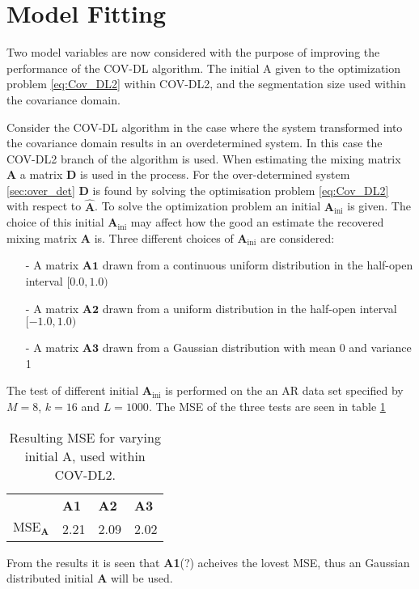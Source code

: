 \section{Model Fitting}
Two model variables are now considered with the purpose of improving the performance of the COV-DL algorithm. The initial A given to the optimization problem \eqref{eq:Cov_DL2} within COV-DL2, and the segmentation size used within the covariance domain.   
   
Consider the COV-DL algorithm in the case where the system transformed into the covariance domain results in an overdetermined system. In this case the COV-DL2 branch of the algorithm is used. 
When estimating the mixing matrix $\mathbf{A}$ a matrix $\mathbf{D}$ is used in the process. For the over-determined system \ref{sec:over_det} $\mathbf{D}$ is found by solving the optimisation problem \eqref{eq:Cov_DL2} with respect to $\hat{\textbf{A}}$. To solve the optimization problem an initial $\mathbf{A}_{\text{ini}}$ is given. The choice of this initial $\mathbf{A}_{\text{ini}}$ may affect how the good an estimate the recovered mixing matrix $\mathbf{A}$ is.
Three different choices of $\mathbf{A}_{\text{ini}}$ are considered:
\begin{itemize}
\item[-] A matrix $\mathbf{A1}$ drawn from a continuous uniform distribution in the half-open interval $[0.0, 1.0)$
\item[-] A matrix $\mathbf{A2}$ drawn from a uniform distribution in the half-open interval $[-1.0, 1.0)$
\item[-] A matrix $\mathbf{A3}$ drawn from a Gaussian distribution with mean 0 and variance 1
\end{itemize}
The test of different initial $\mathbf{A}_{\text{ini}}$ is performed on the 
an AR data set specified by  $M = 8$, $k = 16$ and $L = 1000$. 
The MSE of the three tests are seen in table \ref{tab:iniA} 
\begin{table}[]
\begin{tabular}{llll}
                          & \textbf{A1} & \textbf{A2} & \textbf{A3} \\
$\text{MSE}_{\mathbf{A}}$ &   2.21          & 2.09            & 2.02           
\end{tabular}
\caption{Resulting MSE for varying initial A, used within COV-DL2.}
\label{tab:iniA}
\end{table}
From the results it is seen that \textbf{A1}(?) acheives the lovest MSE, thus an Gaussian distributed initial $\textbf{A}$ will be used.    
